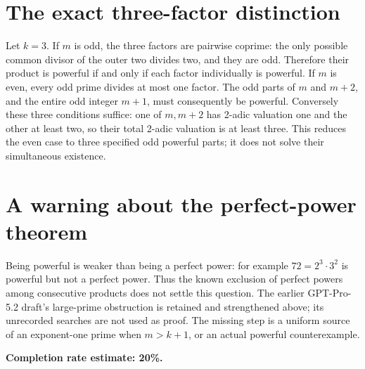 \documentclass[11pt]{article}
\begin{document}
\section*{The exact three-factor distinction}
Let $k=3$. If $m$ is odd, the three factors are pairwise coprime: the only possible common divisor of the outer two divides two, and they are odd. Therefore their product is powerful if and only if each factor individually is powerful.
If $m$ is even, every odd prime divides at most one factor. The odd parts of $m$ and $m+2$, and the entire odd integer $m+1$, must consequently be powerful. Conversely these three conditions suffice: one of $m,m+2$ has 2-adic valuation one and the other at least two, so their total 2-adic valuation is at least three. This reduces the even case to three specified odd powerful parts; it does not solve their simultaneous existence.

\section*{A warning about the perfect-power theorem}
Being powerful is weaker than being a perfect power: for example $72=2^3\cdot3^2$ is powerful but not a perfect power. Thus the known exclusion of perfect powers among consecutive products does not settle this question. The earlier GPT-Pro-5.2 draft's large-prime obstruction is retained and strengthened above; its unrecorded searches are not used as proof. The missing step is a uniform source of an exponent-one prime when $m>k+1$, or an actual powerful counterexample.

\textbf{Completion rate estimate: 20\%.}
\end{document}
